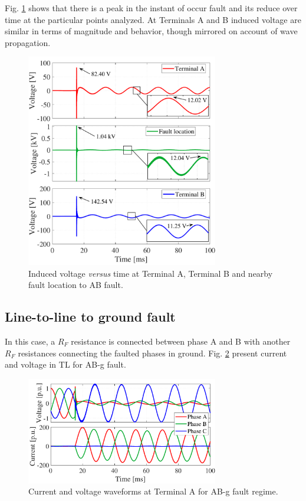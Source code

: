 \documentclass[5p,twocolumn]{elsarticle}
\begin{document}
Fig. \ref{fig:ABindVoltage3plots} shows that there is a peak in the instant of occur fault and its reduce over time at the particular points analyzed. At Terminals A and B induced voltage are similar in terms of magnitude and behavior, though mirrored on account of wave propagation. 

\begin{figure}[H]
	\begin{center}
		\includegraphics[width=8.4cm]{img/ABindVoltage_3plots.pdf}    %
		\caption{Induced voltage \textit{versus} time at Terminal A, Terminal B and nearby fault location to AB fault.} 
		\label{fig:ABindVoltage3plots}
	\end{center}
\end{figure}

\subsection{Line-to-line to ground fault}

In this case, a $R_{F}$ resistance is connected between phase A and B with another $R_{F}$ resistances connecting the faulted phases in ground. Fig. \ref{fig:ABGindVoltageTL} present current and voltage in TL for AB-g fault.

\begin{figure}[h]
	\begin{center}
		\includegraphics[width=8.4cm]{img/ABGindVoltage_TL.pdf}    %
		\caption{Current and voltage waveforms at Terminal A for AB-g fault regime.} 
		\label{fig:ABGindVoltageTL}
	\end{center}
\end{figure}
\end{document}
